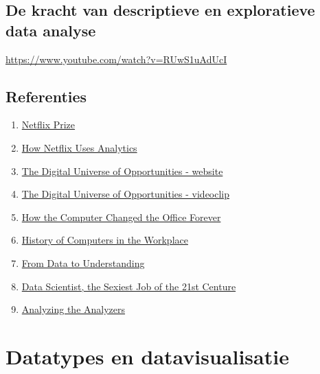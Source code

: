 \documentclass[]{memoir}
\providecommand{\tightlist}{%
  \setlength{\itemsep}{0pt}\setlength{\parskip}{0pt}}
\begin{document}
\hypertarget{de-kracht-van-descriptieve-en-exploratieve-data-analyse}{%
\section{De kracht van descriptieve en exploratieve data analyse}\label{de-kracht-van-descriptieve-en-exploratieve-data-analyse}}

\url{https://www.youtube.com/watch?v=RUwS1uAdUcI}

\hypertarget{referenties}{%
\section{Referenties}\label{referenties}}

\begin{enumerate}
\def\labelenumi{\arabic{enumi}.}
\tightlist
\item
  \href{https://en.wikipedia.org/wiki/Netflix_Prize}{Netflix Prize}
\item
  \href{https://blog.kissmetrics.com/how-netflix-uses-analytics/}{How Netflix Uses Analytics}
\item
  \href{https://www.emc.com/leadership/digital-universe/2014iview/index.htm}{The Digital Universe of Opportunities - website}
\item
  \href{http://bcove.me/9s38pkjm}{The Digital Universe of Opportunities - videoclip}
\item
  \href{http://www.bbc.com/news/magazine-23509153}{How the Computer Changed the Office Forever}
\item
  \href{http://www.ehow.com/about_6362639_history-computers-workplace.html}{History of Computers in the Workplace}
\item
  \href{https://en.wikipedia.org/wiki/File:DIKW_(1).png}{From Data to Understanding}
\item
  \href{https://hbr.org/2012/10/data-scientist-the-sexiest-job-of-the-21st-century}{Data Scientist, the Sexiest Job of the 21st Centure}
\item
  \href{http://www.oreilly.com/data/free/files/analyzing-the-analyzers.pdf}{Analyzing the Analyzers}
\end{enumerate}

\hypertarget{datatypes-en-datavisualisatie}{%
\chapter{Datatypes en datavisualisatie}\label{datatypes-en-datavisualisatie}}
\end{document}
